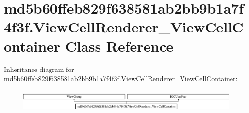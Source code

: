 \hypertarget{classmd5b60ffeb829f638581ab2bb9b1a7f4f3f_1_1ViewCellRenderer__ViewCellContainer}{}\section{md5b60ffeb829f638581ab2bb9b1a7f4f3f.\+View\+Cell\+Renderer\+\_\+\+View\+Cell\+Container Class Reference}
\label{classmd5b60ffeb829f638581ab2bb9b1a7f4f3f_1_1ViewCellRenderer__ViewCellContainer}
Inheritance diagram for md5b60ffeb829f638581ab2bb9b1a7f4f3f.\+View\+Cell\+Renderer\+\_\+\+View\+Cell\+Container\+:\begin{figure}[H]
\begin{center}
\leavevmode
\includegraphics[height=1.196581cm]{classmd5b60ffeb829f638581ab2bb9b1a7f4f3f_1_1ViewCellRenderer__ViewCellContainer}
\end{center}
\end{figure}
